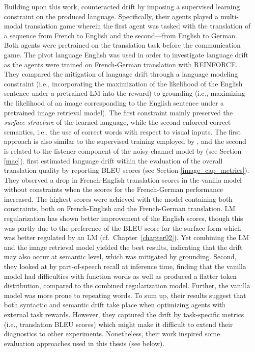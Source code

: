 Building upon this work, \cite{lee2019countering} counteracted drift by imposing a supervised learning constraint on the produced language. Specifically, their agents played a multi-modal translation game wherein the first agent was tasked with the translation of a sequence from French to English and the second---from English to German. Both agents were pretrained on the translation task before the communication game. The pivot language English was used in order to investigate language drift as the agents were trained on French-German translation with REINFORCE. They compared the mitigation of language drift through a language modeling constraint (i.e., incorporating the maximization of the likelihood of the English sentence under a pretrained LM into the reward) to grounding (i.e., maximizing the likelihood of an image corresponding to the English sentence under a pretrained image retrieval model). The first constraint mainly preserved the \textit{surface structure} of the learned language, while the second enforced correct semantics, i.e., the use of correct words with respect to visual inputs. The first approach is also similar to the supervised training employed by \cite{lewis2017deal}, and the second is related to the listener component of the noisy channel model by \cite{lazaridou2020multi} (see Section \ref{mac}).
\cite{lee2019countering} first estimated language drift within the evaluation of the overall translation quality by reporting BLEU scores (see Section \ref{image_cap_metrics}). They observed a drop in French-English translation scores in the vanilla model without constraints when the scores for the French-German performance increased. The highest scores were achieved with the model containing both constraints, both on French-English and the French-German translation. LM regularization has shown better improvement of the English scores, though this was partly due to the preference of the BLEU score for the surface form which was better regulated by an LM (cf.~Chapter~\ref{chapter02}). Yet combining the LM and the image retrieval model yielded the best results, indicating that the drift may also occur at semantic level, which was mitigated by grounding. Second, they looked at by part-of-speech recall at inference time, finding that the vanilla model had difficulties with function words as well as produced a flatter token distribution, compared to the combined regularization model. Further, the vanilla model was more prone to repeating words. To sum up, their results suggest that both syntactic and semantic drift take place when optimizing agents with external task rewards. However, they captured the drift by task-specific metrics (i.e., translation BLEU scores) which might make it difficult to extend their diagnostics to other experiments. Nonetheless, their work inspired some evaluation approaches used in this thesis (see below).

